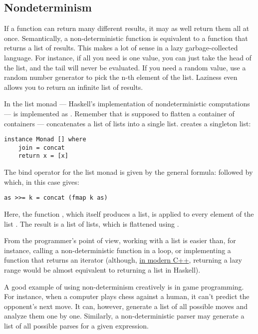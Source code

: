 \subsection{Nondeterminism}\label{nondeterminism}

If a function can return many different results, it may as well return
them all at once. Semantically, a non-deterministic function is
equivalent to a function that returns a list of results. This makes a
lot of sense in a lazy garbage-collected language. For instance, if all
you need is one value, you can just take the head of the list, and the
tail will never be evaluated. If you need a random value, use a random
number generator to pick the n-th element of the list. Laziness even
allows you to return an infinite list of results.

In the list monad --- Haskell's implementation of nondeterministic
computations ---  is implemented as .
Remember that  is supposed to flatten a container of
containers ---  concatenates a list of lists into a
single list.  creates a singleton list:

\begin{verbatim}
instance Monad [] where
    join = concat
    return x = [x]
\end{verbatim}
The bind operator for the list monad is given by the general formula:
 followed by  which, in this case gives:

\begin{verbatim}
as >>= k = concat (fmap k as)
\end{verbatim}
Here, the function , which itself produces a list, is applied
to every element of the list . The result is a list of lists,
which is flattened using .

From the programmer's point of view, working with a list is easier than,
for instance, calling a non-deterministic function in a loop, or
implementing a function that returns an iterator (although,
\href{http://ericniebler.com/2014/04/27/range-comprehensions/}{in modern
C++}, returning a lazy range would be almost equivalent to returning a
list in Haskell).

A good example of using non-determinism creatively is in game
programming. For instance, when a computer plays chess against a human,
it can't predict the opponent's next move. It can, however, generate a
list of all possible moves and analyze them one by one. Similarly, a
non-deterministic parser may generate a list of all possible parses for
a given expression.

